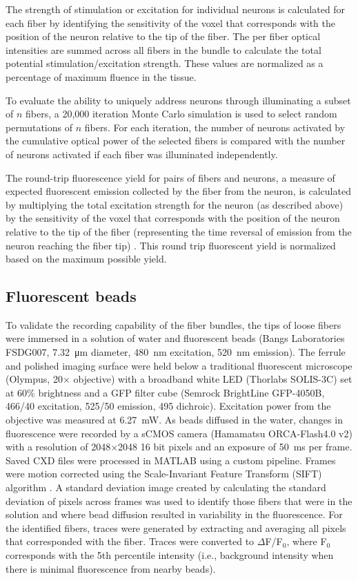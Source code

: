 The strength of stimulation or excitation for individual neurons 
is calculated for each fiber by identifying the sensitivity of 
the voxel that corresponds with the position of the neuron relative 
to the tip of the fiber. The per fiber optical intensities are summed 
across all fibers in the bundle to calculate the total potential 
stimulation/excitation strength. These 
values are normalized as a percentage of maximum fluence in the tissue.

To evaluate the ability to uniquely address neurons through 
illuminating a subset of $n$ fibers, a 20,000 iteration Monte 
Carlo simulation is used to select 
random permutations of $n$ fibers. For each iteration, the 
number of neurons activated by the cumulative optical power of the 
selected fibers is compared with the number of neurons 
activated if each fiber was illuminated independently.

The round-trip fluorescence yield for pairs of fibers and neurons, 
a measure of expected fluorescent emission collected by the fiber from the neuron, is 
calculated by multiplying the total excitation strength for the 
neuron (as described above) by the sensitivity of the voxel that 
corresponds with the position of the neuron relative to the tip of 
the fiber (representing the time reversal of emission from the 
neuron reaching the fiber tip) \cite{Hillman:2004wca,Burgess:2008uu}. 
This round trip fluorescent yield is normalized based on the maximum 
possible yield.

\subsection{Fluorescent beads}

To validate the recording capability of the fiber bundles, the tips of loose 
fibers were immersed in a solution of water and fluorescent beads 
(Bangs Laboratories FSDG007, 7.32~\si{\micro\meter} diameter, 480~nm excitation, 
520~nm emission). The ferrule and polished imaging surface were held 
below a traditional fluorescent microscope (Olympus, 20$\times$ objective) 
with a broadband white LED (Thorlabs SOLIS-3C) set at 60\% brightness and 
a GFP filter cube (Semrock BrightLine GFP-4050B, 466/40 excitation, 525/50 
emission, 495 dichroic). Excitation power from the objective was measured 
at 6.27~mW. As beads diffused in the water, changes in fluorescence were 
recorded by a sCMOS camera 
(Hamamatsu ORCA-Flash4.0 v2) with a resolution of 2048$\times$2048 16 bit 
pixels and an exposure of 50~ms per frame. Saved CXD files were 
processed in MATLAB using a custom pipeline. Frames were motion corrected 
using the Scale-Invariant Feature Transform (SIFT) algorithm 
\cite{vedaldi08vlfeat,lowe1999object,Lowe:2004kp}. A standard 
deviation image created by calculating the standard deviation of 
pixels across frames was used to identify those fibers that were in the 
solution and where bead diffusion resulted in variability in the 
fluorescence. For the identified fibers, traces were generated by 
extracting and averaging all pixels that corresponded with the fiber. 
Traces were converted to $\Delta$F/F$_0$, where F$_0$ corresponds with 
the 5th percentile intensity (i.e., background intensity when there is 
minimal fluorescence from nearby beads).


